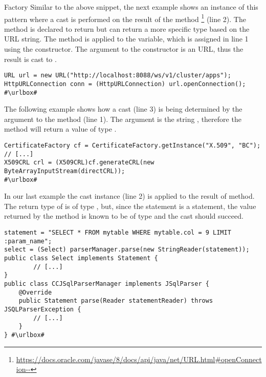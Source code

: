 \begin{pattern}{Factory}
Similar to the above snippet,
the next example shows an instance of this pattern where a cast is performed on the result of the  method%
\footnote{\url{https://docs.oracle.com/javase/8/docs/api/java/net/URL.html\#openConnection--}}
(line 2).
The method is declared to return  but can return a more specific type based on the URL string.
The  method is applied to the  variable,
which is assigned in line 1 using the  constructor.
The argument to the constructor is an  URL,
thus the result is cast to .
\def\urlvar{http://bit.ly/apache_hadoop_2E6KY6T}
\begin{verbatim}
URL url = new URL("http://localhost:8088/ws/v1/cluster/apps");
HttpURLConnection conn = (HttpURLConnection) url.openConnection();
#\urlbox#
\end{verbatim}

The following example shows how a cast (line 3) is being determined by the argument to the  method (line 1).
The argument is the string ,
therefore the method  will return a value of type .

\def\urlvar{http://bit.ly/bcgit_bc_java_2TEVScM}
\begin{verbatim}
CertificateFactory cf = CertificateFactory.getInstance("X.509", "BC");
// [...]
X509CRL crl = (X509CRL)cf.generateCRL(new ByteArrayInputStream(directCRL));
#\urlbox#
\end{verbatim}

In our last example the cast instance (line 2) is applied to the result of  method.
The return type of  is of type , but,
since the statement is a  statement,
the value returned by the  method is known to be of type 
and the cast should succeed.
\def\urlvar{http://bit.ly/JSQLParser_JSqlParser_2TecMyB}
\begin{verbatim}
statement = "SELECT * FROM mytable WHERE mytable.col = 9 LIMIT :param_name";
select = (Select) parserManager.parse(new StringReader(statement));
public class Select implements Statement {
        // [...]
}
public class CCJSqlParserManager implements JSqlParser {
    @Override
    public Statement parse(Reader statementReader) throws JSQLParserException {
        // [...]
    }
} #\urlbox#
\end{verbatim}


\end{pattern}
